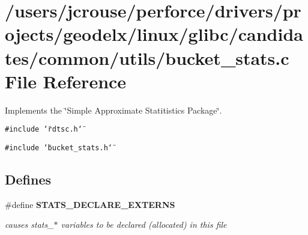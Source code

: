 \section{/users/jcrouse/perforce/drivers/projects/geodelx/linux/glibc/candidates/common/utils/bucket\_\-stats.c File Reference}
\label{bucket__stats_8c}
Implements the \char`\"{}Simple Approximate Statitistics Package\char`\"{}. 


{\tt \#include \char`\"{}rdtsc.h\char`\"{}}\par
{\tt \#include \char`\"{}bucket\_\-stats.h\char`\"{}}\par
\subsection*{Defines}
\begin{CompactItemize}
\item 
{}
\#define {\bf STATS\_\-DECLARE\_\-EXTERNS}\label{bucket__stats_8c_a0}

\begin{CompactList}\small\item\em causes stats\_\-$\ast$ variables to be declared (allocated) in this file\item\end{CompactList}\end{CompactItemize}
